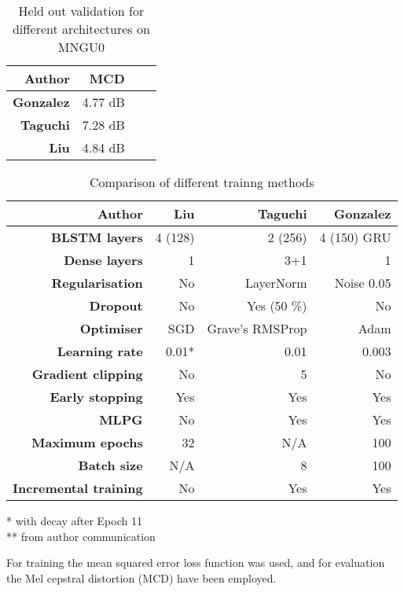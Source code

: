 \documentclass[a4paper]{article}
\begin{document}
\begin{table}[th]
  \caption{Held out validation for different architectures on MNGU0}
  \label{tab:pilot}
  \centering
  \footnotesize

  \begin{tabular}{ r r r r }
    \toprule
    \textbf{Author} & \textbf{MCD} \\
    \midrule
    \textbf{Gonzalez} & 4.77 dB \\
    \textbf{Taguchi} & 7.28 dB \\
    \textbf{Liu} & 4.84 dB \\
    \bottomrule
  \end{tabular}
\end{table}

\begin{table}[th]
  \caption{Comparison of different trainng methods}
  \label{tab:architectures}
  \centering
  \footnotesize

  \begin{tabular}{ r r r r }
    \toprule
    \textbf{Author} & \textbf{Liu} & \textbf{Taguchi} & \textbf{Gonzalez} \\
    \midrule
    \textbf{BLSTM layers} & 4 (128) & 2 (256) & 4 (150) GRU \\
    \textbf{Dense layers} & 1 & 3+1 & 1 \\
    \textbf{Regularisation} & No & LayerNorm & Noise 0.05 \\
    \textbf{Dropout} & No & Yes (50 \%) & No \\
    \textbf{Optimiser} & SGD & Grave's RMSProp & Adam \\
    \textbf{Learning rate} & 0.01* & 0.01 & 0.003 \\
    \textbf{Gradient clipping} & No & 5 & No \\
    \textbf{Early stopping} & Yes & Yes & Yes \\
    \textbf{MLPG} & No & Yes & Yes \\ 
    \textbf{Maximum epochs} & 32 & N/A & 100 \\
    \textbf{Batch size} & N/A & 8 & 100 \\
    \textbf{Incremental training} & No & Yes & Yes \\
    \bottomrule
  \end{tabular}
  * with decay after Epoch 11 \\
  ** from author communication
\end{table}

For training the mean squared error loss function was used, and for
evaluation the Mel cepstral distortion (MCD) have been employed. \cite{Kubichek1993}
\end{document}
